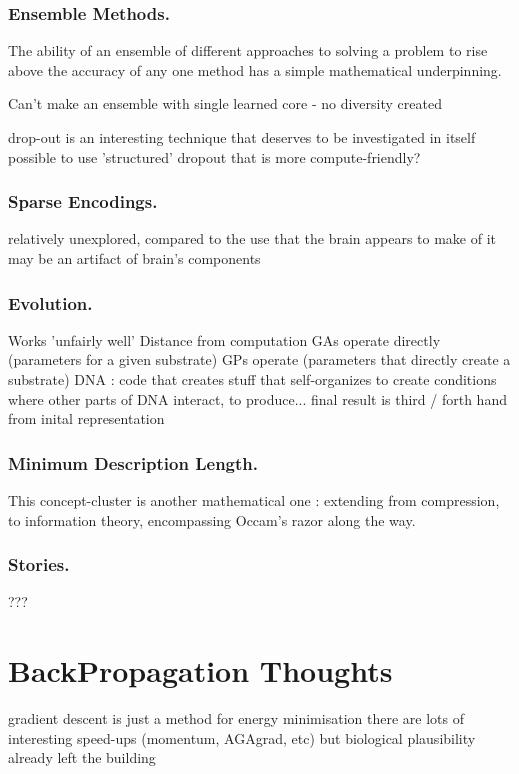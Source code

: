 \documentclass[citeauthoryear]{llncs}
\begin{document}
\subsubsection*{Ensemble Methods.}
The ability of an ensemble of different approaches to solving a problem to rise above the accuracy 
of any one method has a simple mathematical underpinning.  

Can't make an ensemble with single learned core - no diversity created

drop-out is an interesting technique that deserves to be investigated in itself
  possible to use 'structured' dropout that is more compute-friendly?


\subsubsection*{Sparse Encodings.}
  relatively unexplored, compared to the use that the brain appears to make of it
    may be an artifact of brain's components
    
\subsubsection*{Evolution.}
  Works 'unfairly well'
  Distance from computation
    GAs operate directly (parameters for a given substrate)
    GPs operate (parameters that directly create a substrate)
    DNA : code that creates stuff that self-organizes to create conditions where 
      other parts of DNA interact, to produce...   
        final result is third / forth hand from inital representation

\subsubsection*{Minimum Description Length.}
This concept-cluster is another mathematical one : extending from compression, to information theory,
encompassing Occam's razor along the way.

\subsubsection*{Stories.}
  ???
  

\section{BackPropagation Thoughts}
  gradient descent is just a method for energy minimisation
    there are lots of interesting speed-ups (momentum, AGAgrad, etc)
      but biological plausibility already left the building
      
\end{document}
